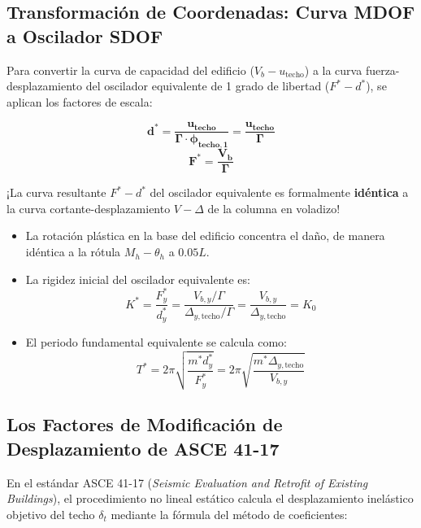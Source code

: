 \documentclass[11pt,letterpaper]{article}
\begin{document}
\subsection{Transformación de Coordenadas: Curva MDOF a Oscilador SDOF}

Para convertir la curva de capacidad del edificio ($V_b - u_{\text{techo}}$) a la curva fuerza-desplazamiento del oscilador equivalente de 1 grado de libertad ($F^* - d^*$), se aplican los factores de escala:

\begin{equation}
    \mathbf{d^* = \frac{u_{\text{techo}}}{\Gamma \cdot \phi_{\text{techo},1}} = \frac{u_{\text{techo}}}{\Gamma}}
    \label{eq:transf_d_star}
\end{equation}
\begin{equation}
    \mathbf{F^* = \frac{V_b}{\Gamma}}
    \label{eq:transf_f_star}
\end{equation}

\begin{conceptbox}
¡La curva resultante $F^* - d^*$ del oscilador equivalente es formalmente \textbf{idéntica} a la curva cortante-desplazamiento $V - \Delta$ de la columna en voladizo!
\begin{itemize}
    \item La rotación plástica en la base del edificio concentra el daño, de manera idéntica a la rótula $M_h - \theta_h$ a $0.05 L$.
    \item La rigidez inicial del oscilador equivalente es:
    $$K^* = \frac{F_y^*}{d_y^*} = \frac{V_{b,y} / \Gamma}{\Delta_{y,\text{techo}} / \Gamma} = \frac{V_{b,y}}{\Delta_{y,\text{techo}}} = K_0$$
    \item El periodo fundamental equivalente se calcula como:
    $$T^* = 2\pi \sqrt{\frac{m^* d_y^*}{F_y^*}} = 2\pi \sqrt{\frac{m^* \Delta_{y,\text{techo}}}{V_{b,y}}}$$
\end{itemize}
\end{conceptbox}

\subsection{Los Factores de Modificación de Desplazamiento de ASCE 41-17}

En el estándar ASCE 41-17 (\textit{Seismic Evaluation and Retrofit of Existing Buildings}), el procedimiento no lineal estático calcula el desplazamiento inelástico objetivo del techo $\delta_t$ mediante la fórmula del método de coeficientes:
\end{document}
